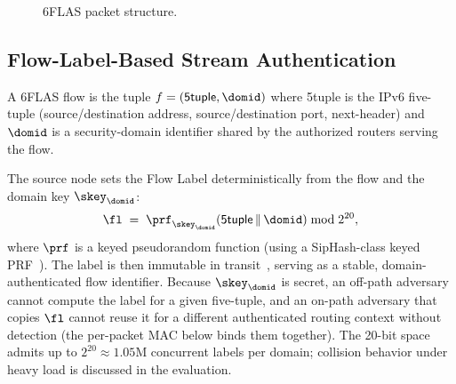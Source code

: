 \begin{figure}[t]
\centering
\footnotesize
\setlength{\fboxsep}{4pt}
\caption{6FLAS packet structure.}
\label{fig:overview}
\end{figure}

\subsection{Flow-Label-Based Stream Authentication}
\label{sec:fl-auth}

\begin{definition}
\label{def:flow}
A 6FLAS flow is the tuple $f=(\textsf{5tuple},\domid)$ where \textsf{5tuple} is
the IPv6 five-tuple (source/destination address, source/destination port,
next-header) and $\domid$ is a security-domain identifier shared by the
authorized routers serving the flow.
\end{definition}

The source node sets the Flow Label deterministically from the flow and the
domain key $\skey_\domid$:
\begin{equation}
\label{eq:fl}
\fl \;=\; \prf_{\skey_\domid}(\textsf{5tuple}\,\|\,\domid) \bmod 2^{20},
\end{equation}
where $\prf$ is a keyed pseudorandom function (using a SipHash-class keyed
PRF~\cite{siphash}). The label is then immutable in
transit~\cite{rfc6437}, serving as a stable, domain-authenticated flow identifier. Because $\skey_\domid$ is secret, an off-path adversary
cannot compute the label for a given five-tuple, and an on-path
adversary that copies $\fl$ cannot reuse it for a different authenticated routing context without detection (the per-packet MAC below binds them together). The 20-bit space
admits up to $2^{20}\approx 1.05$M concurrent labels per domain; collision
behavior under heavy load is discussed in the evaluation.

